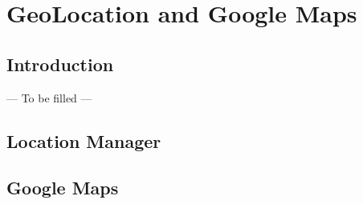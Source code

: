 \chapter{GeoLocation and Google Maps}
\label{GGM}

\section{Introduction}
\label{GGM:introduction}
--- To be filled ---

\section{Location Manager}

\section{Google Maps}


